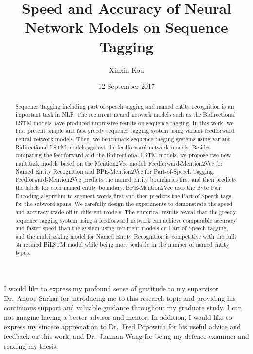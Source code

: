 \documentclass{sfuthesis}
\title{Speed and Accuracy of Neural Network Models on Sequence Tagging}
\author{Xinxin Kou}
\date{12 September 2017}
\begin{document}
\frontmatter
\maketitle{}

\begin{abstract}
Sequence Tagging including part of speech tagging and named entity recognition is an important task in NLP. The recurrent neural network models such as the Bidirectional LSTM models have produced impressive results on sequence tagging. In this work, we first present simple and fast greedy sequence tagging system using variant feedforward neural network models. Then, we benchmark sequence tagging systems using variant Bidirectional LSTM models against the feedforward network models. Besides comparing the feedforward and the Bidirectional LSTM models, we propose two new multitask models based on the Mention2Vec model: Feedforward-Mention2Vec for Named Entity Recognition and BPE-Mention2Vec for Part-of-Speech Tagging. Feedforward-Mention2Vec predicts the named entity boundaries first and then predicts the labels for each named entity boundary. BPE-Mention2Vec uses the Byte Pair Encoding algorithm to segment words first and then predicts the Part-of-Speech tags for the subword spans. We carefully design the experiments to demonstrate the speed and accuracy trade-off in different models. The empirical results reveal that the greedy sequence tagging system using a feedforward network can achieve comparable accuracy and faster speed than the system using recurrent models on Part-of-Speech tagging, and the multitasking model for Named Entity Recognition is competitive with the fully structured BiLSTM model while being more scalable in the number of named entity types.

\end{abstract}


\begin{acknowledgements} %

I would like to express my profound sense of gratitude to my supervisor Dr.\ Anoop Sarkar for introducing me to this research
topic and providing his continuous support and valuable guidance throughout my graduate study. I can not imagine having a better advisor and mentor. In addition, I would like to express my sincere appreciation to Dr.\ Fred Popowich for his useful advice and feedback on this work, and Dr.\ Jiannan Wang for being my defence examiner and reading my thesis.




\end{acknowledgements}
\end{document}
